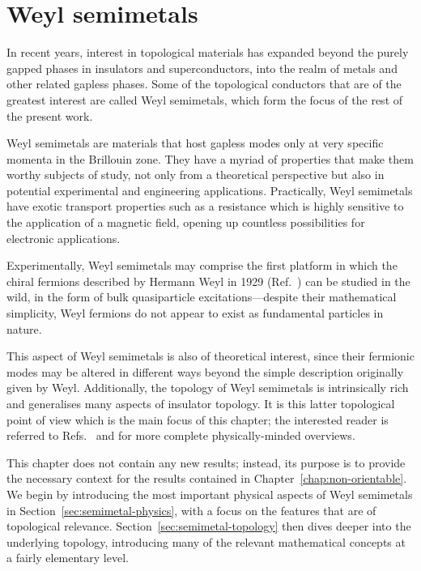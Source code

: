\chapter{Weyl semimetals}\label{chap:WSM}

In recent years, interest in topological materials has expanded beyond the purely gapped phases in insulators and superconductors, into the realm of metals and other related gapless phases. Some of the topological conductors that are of the greatest interest are called Weyl semimetals, which form the focus of the rest of the present work.

Weyl semimetals are materials that host gapless modes only at very specific momenta in the Brillouin zone. They have a myriad of properties that make them worthy subjects of study, not only from a theoretical perspective but also in potential experimental and engineering applications. Practically, Weyl semimetals have exotic transport properties such as a resistance which is highly sensitive to the application of a magnetic field, opening up countless possibilities for electronic applications. 

Experimentally, Weyl semimetals may comprise the first platform in which the chiral fermions described by Hermann Weyl in 1929 (Ref.~\cite{Weyl_fermions}) can be studied in the wild, %
in the form of bulk quasiparticle excitations---despite their mathematical simplicity, Weyl fermions do not appear to exist as fundamental particles in nature. %

This aspect of Weyl semimetals is also of theoretical interest, since their fermionic modes may be altered in different ways beyond the simple description originally given by Weyl. Additionally, the topology of Weyl semimetals is intrinsically rich and generalises many aspects of insulator topology. It is this latter topological point of view which is the main focus of this chapter; the interested reader is referred to Refs.~\cite{Armitage_WSM-review} and \cite{Hosur_WSM-transport} for more complete physically-minded overviews.

This chapter does not contain any new results; instead, its purpose is to provide the necessary context for the results contained in Chapter~\ref{chap:non-orientable}. We begin by introducing the most important physical aspects of Weyl semimetals in Section~\ref{sec:semimetal-physics}, with a focus on the features that are of topological relevance. Section~\ref{sec:semimetal-topology} then dives deeper into the underlying topology, introducing many of the relevant mathematical concepts at a fairly elementary level.

